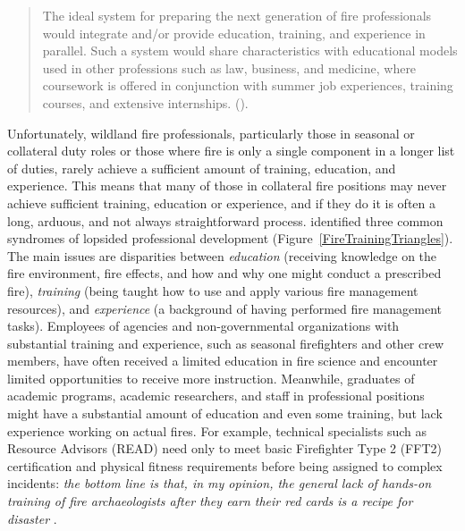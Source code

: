 \documentclass[fire,casereport,accept,moreauthors,pdftex]{Definitions/mdpi}  %
\begin{document}
\begin{quote}
The ideal system for preparing the next generation of fire professionals would integrate and/or provide education, training, and experience in parallel.
Such a system would share characteristics with educational models used in other professions such as law, business, and medicine, where coursework is offered in conjunction with summer job experiences, training courses, and extensive internships. (\citet[][p.~344]{kobziar2009}).
\end{quote} %

Unfortunately, wildland fire professionals, particularly those in seasonal or collateral duty roles or those where fire is only a single component in a longer list of duties, rarely achieve a sufficient amount of training, education, and experience.
This means that many of those in collateral fire positions may never achieve sufficient training, education or experience, and if they do it is often a long, arduous, and not always straightforward process.
\citet{kobziar2009} identified three common syndromes of lopsided professional development (Figure~\ref{FireTrainingTriangles}).
The main issues are disparities between \emph{education} (receiving knowledge on the fire environment, fire effects, and how and why one might conduct a prescribed fire), \emph{training} (being taught how to use and apply various fire management resources), and \emph{experience} (a background of having performed fire management tasks).
Employees of agencies and non-governmental organizations with substantial training and experience, such as seasonal firefighters and other crew members, have often received a limited education in fire science and encounter limited opportunities to receive more instruction.
Meanwhile, graduates of academic programs, academic researchers, and staff in professional positions might have a substantial amount of education and even some training, but lack experience working on actual fires.
For example, technical specialists such as Resource Advisors (READ) need only to meet basic Firefighter Type 2 (FFT2) certification and physical fitness requirements before being assigned to complex incidents: \emph{the bottom line is that, in my opinion, the general lack of hands-on training of fire archaeologists after they earn their red cards is a recipe for disaster} \citep[][p.~3]{hangan2010}. 
\end{document}
